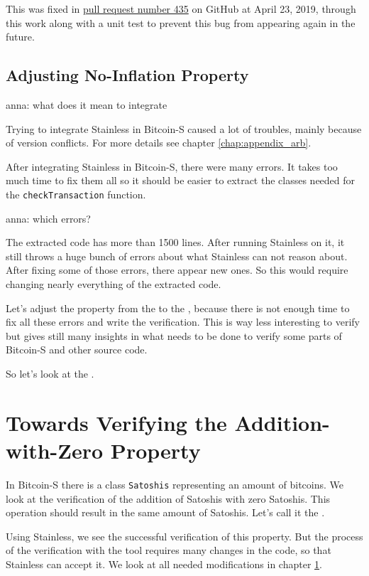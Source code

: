 \documentclass[runningheads]{llncs}
\newcommand{\todo}[1]{{\par \color{red}#1}}
\begin{document}
This was fixed in
\href{https://github.com/bitcoin-s/bitcoin-s/pull/435}{pull request
  number 435} on GitHub at April 23, 2019, through this work along
with a unit test to prevent this bug from appearing again in the
future.


\subsection{Adjusting No-Inflation Property}

\todo{anna: what does it mean to integrate}

Trying to integrate Stainless in Bitcoin-S caused a lot of troubles,
mainly because of version conflicts.  For more details see chapter
\ref{chap:appendix_arb}.

After integrating Stainless in Bitcoin-S, there were many errors.  It
takes too much time to fix them all so it should be easier to extract
the classes needed for the \texttt{checkTransaction} function.
\todo{anna: which errors?}

The extracted code has more than 1500 lines.  After running Stainless
on it, it still throws a huge bunch of errors about what Stainless can
not reason about.  After fixing some of those errors, there appear new
ones.  So this would require changing nearly everything of the
extracted code.

Let's adjust the property from the  to the
, because there is not enough time to fix all
these errors and write the verification.  This is way less interesting
to verify but gives still many insights in what needs to be done to
verify some parts of Bitcoin-S and other source code.

So let's look at the .



\section{Towards Verifying the Addition-with-Zero Property}

\label{chap:verify_add}

In Bitcoin-S there is a class \texttt{Satoshis} representing an amount of bitcoins.
We look at the verification of the addition of Satoshis with zero Satoshis.
This operation should result in the same amount of Satoshis.
Let's call it the .

Using Stainless, we see the successful verification of this property.
But the process of the verification with the tool requires many
changes in the code, so that Stainless can accept it.  We look at all
needed modifications in chapter \ref{chap:verify_add}.
\end{document}
